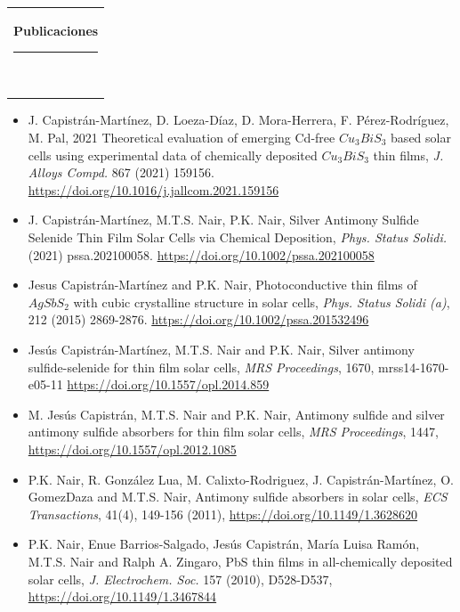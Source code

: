 \documentclass[10pt,letter]{article}
\newcommand{\mpwidth}{\linewidth-\fboxsep-\fboxsep}
\newcommand{\cvtext}[1] {
	\begin{tabular*}{1\mpwidth}{p{0.98\mpwidth}}
		\parbox{1\mpwidth}{#1}
	\end{tabular*}
}
\newcommand{\cvsection}[1] {
	\vspace{14pt}
	\cvtext{
		\textbf{\LARGE{\textcolor{darkcol}{#1}}}\\[-4pt]
		\textcolor{accentcol}{ \rule{0.2\textwidth}{1.5pt} } \\
	}
}
\begin{document}
\begin{paracol}{2}
\begin{rightcolumn}
\cvsection{Publicaciones}

\begin{itemize}[leftmargin=*]

\item J. Capistr\'an-Mart\'inez, D. Loeza-D\'iaz, D. Mora-Herrera, F. P\'erez-Rodr\'iguez, M. Pal, 2021 Theoretical evaluation of emerging Cd-free $Cu_3BiS_3$ based solar cells using experimental
data of chemically deposited $Cu_3BiS_3$ thin films, \textit{J. Alloys Compd.} 867 (2021) 159156. \url{https://doi.org/10.1016/j.jallcom.2021.159156}

\item J. Capistr\'an-Mart\'inez, M.T.S. Nair, P.K. Nair, Silver Antimony Sulfide Selenide Thin Film Solar Cells via Chemical Deposition, \textit{Phys. Status Solidi.} (2021) pssa.202100058. \url{https://doi.org/10.1002/pssa.202100058}

\item Jesus Capistr\'an-Mart\'inez and P.K. Nair, Photoconductive thin films of $AgSbS_2$ with cubic crystalline structure in solar cells, \textit{Phys. Status Solidi (a)}, 212 (2015) 2869-2876. \url{https://doi.org/10.1002/pssa.201532496}

\item Jes\'us Capistr\'an-Mart\'inez, M.T.S. Nair and P.K. Nair, Silver antimony sulfide-selenide for thin film solar cells, \textit{MRS Proceedings}, 1670, mrss14-1670-e05-11 \url{https://doi.org/10.1557/opl.2014.859}

\item M. Jes\'us Capistr\'an, M.T.S. Nair and P.K. Nair, Antimony sulfide and silver antimony sulfide absorbers for thin film solar cells, \textit{MRS Proceedings}, 1447, \url{https://doi.org/10.1557/opl.2012.1085}

\item P.K. Nair, R. Gonz\'alez Lua, M. Calixto-Rodriguez, J. Capistr\'an-Mart\'inez, O. GomezDaza and M.T.S. Nair, Antimony sulfide absorbers in solar cells, \textit{ECS Transactions}, 41(4), 149-156 (2011), \url{https://doi.org/10.1149/1.3628620}

\item P.K. Nair, Enue Barrios-Salgado, Jes\'us Capistr\'an, Mar\'ia Luisa Ram\'on, M.T.S. Nair and Ralph A. Zingaro, PbS thin films in all-chemically deposited solar cells, \textit{J. Electrochem. Soc.} 157 (2010), D528-D537, \url{https://doi.org/10.1149/1.3467844}
 
\end{itemize}


\end{rightcolumn}
\end{paracol}
\end{document}
